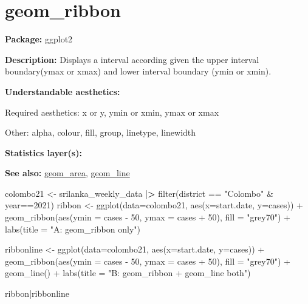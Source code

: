 \documentclass[
]{book}
\newenvironment{Shaded}{\begin{snugshade}}{\end{snugshade}}
\newcommand{\AttributeTok}[1]{\textcolor[rgb]{0.77,0.63,0.00}{#1}}
\newcommand{\DecValTok}[1]{\textcolor[rgb]{0.00,0.00,0.81}{#1}}
\newcommand{\ErrorTok}[1]{\textcolor[rgb]{0.64,0.00,0.00}{\textbf{#1}}}
\newcommand{\FunctionTok}[1]{\textcolor[rgb]{0.00,0.00,0.00}{#1}}
\newcommand{\NormalTok}[1]{#1}
\newcommand{\OtherTok}[1]{\textcolor[rgb]{0.56,0.35,0.01}{#1}}
\newcommand{\SpecialCharTok}[1]{\textcolor[rgb]{0.00,0.00,0.00}{#1}}
\newcommand{\StringTok}[1]{\textcolor[rgb]{0.31,0.60,0.02}{#1}}
\begin{document}
\hypertarget{geom_ribbon}{%
\section{geom\_ribbon}\label{geom_ribbon}}

\textbf{Package: } ggplot2 \autocite{R-ggplot2}

\textbf{Description: } Displays a interval according given the upper interval boundary(ymax or xmax) and lower interval boundary (ymin or xmin).

\textbf{Understandable aesthetics:}

Required aesthetics: x or y, ymin or xmin, ymax or xmax

Other: alpha, colour, fill, group, linetype, linewidth

\textbf{Statistics layer(s):}

\textbf{See also: } \protect\hyperlink{area}{geom\_area}, \protect\hyperlink{line}{geom\_line}

\begin{Shaded}
\begin{Highlighting}[]
\NormalTok{colombo21 }\OtherTok{\textless{}{-}}\NormalTok{ srilanka\_weekly\_data }\SpecialCharTok{|}\ErrorTok{\textgreater{}}
  \FunctionTok{filter}\NormalTok{(district }\SpecialCharTok{==} \StringTok{"Colombo"} \SpecialCharTok{\&}\NormalTok{ year}\SpecialCharTok{==}\DecValTok{2021}\NormalTok{)}
\NormalTok{ribbon }\OtherTok{\textless{}{-}} \FunctionTok{ggplot}\NormalTok{(}\AttributeTok{data=}\NormalTok{colombo21, }\FunctionTok{aes}\NormalTok{(}\AttributeTok{x=}\NormalTok{start.date, }\AttributeTok{y=}\NormalTok{cases)) }\SpecialCharTok{+} 
  \FunctionTok{geom\_ribbon}\NormalTok{(}\FunctionTok{aes}\NormalTok{(}\AttributeTok{ymin =}\NormalTok{ cases }\SpecialCharTok{{-}} \DecValTok{50}\NormalTok{, }\AttributeTok{ymax =}\NormalTok{ cases }\SpecialCharTok{+} \DecValTok{50}\NormalTok{), }\AttributeTok{fill =} \StringTok{"grey70"}\NormalTok{) }\SpecialCharTok{+} \FunctionTok{labs}\NormalTok{(}\AttributeTok{title =} \StringTok{"A: \textasciigrave{}geom\_ribbon\textasciigrave{} only"}\NormalTok{)}

\NormalTok{ribbonline }\OtherTok{\textless{}{-}} \FunctionTok{ggplot}\NormalTok{(}\AttributeTok{data=}\NormalTok{colombo21, }\FunctionTok{aes}\NormalTok{(}\AttributeTok{x=}\NormalTok{start.date, }\AttributeTok{y=}\NormalTok{cases)) }\SpecialCharTok{+} 
  \FunctionTok{geom\_ribbon}\NormalTok{(}\FunctionTok{aes}\NormalTok{(}\AttributeTok{ymin =}\NormalTok{ cases }\SpecialCharTok{{-}} \DecValTok{50}\NormalTok{, }\AttributeTok{ymax =}\NormalTok{ cases }\SpecialCharTok{+} \DecValTok{50}\NormalTok{), }\AttributeTok{fill =} \StringTok{"grey70"}\NormalTok{) }\SpecialCharTok{+} \FunctionTok{geom\_line}\NormalTok{() }\SpecialCharTok{+}
  \FunctionTok{labs}\NormalTok{(}\AttributeTok{title =} \StringTok{"B: \textasciigrave{}geom\_ribbon + geom\_line\textasciigrave{} both"}\NormalTok{)}

\NormalTok{ribbon}\SpecialCharTok{|}\NormalTok{ribbonline}
\end{Highlighting}
\end{Shaded}
\end{document}
